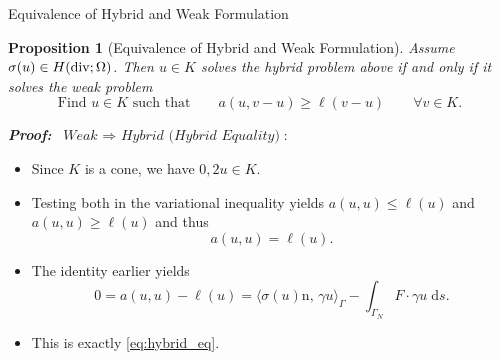 \documentclass[10pt,aspectratio=169]{beamer}
\newtheorem{proposition}{Proposition}[section]
\def\d{{\mathrm{d}}}
\def\ds{{\d s}}
\newcommand{\diver}{\operatornamewithlimits{div}}
\begin{document}
\begin{frame}{Equivalence of Hybrid and Weak Formulation}
	\begin{proposition}[Equivalence of Hybrid and Weak Formulation]
		Assume $\sigma(u)\in H(\diver;\Omega)$. Then $u\in K$ solves the hybrid problem above if and only if it solves the weak problem
		\begin{equation*}
			\text{Find }u\in K\text{ such that}\qquad a(u,v-u)\ge\ell(v-u)\qquad \forall v\in K.
		\end{equation*}
	\end{proposition}
	\textbf{\em Proof:} $\ \textit{Weak }\Rightarrow\textit{ Hybrid (Hybrid Equality)}$:
	\begin{itemize}
		\item Since $K$ is a cone, we have $0,2u\in K$.
		\item Testing both in the variational inequality yields $a(u,u)\le \ell(u)$ and $a(u,u)\ge \ell(u)$ and thus
		      \begin{equation*}
			      a(u,u)= \ell(u).
		      \end{equation*}
		\item The identity earlier yields
		      \begin{equation*}
			      0 = a(u,u)-\ell(u) = \langle\sigma(u)\mathrm{n},\,\gamma u\rangle_\Gamma -\int_{\Gamma_N}F\cdot\gamma u\;\ds.
		      \end{equation*}
		\item This is exactly \eqref{eq:hybrid_eq}.
	\end{itemize}
\end{frame}
\end{document}
